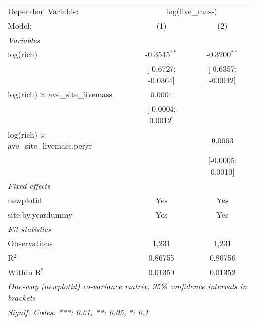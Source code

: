 \begin{tabular}{lcc}
\tabularnewline\midrule\midrule
Dependent Variable:&\multicolumn{2}{c}{log(live\_mass)}\\
Model:&(1) & (2)\\
\midrule \emph{Variables}&   &  \\
log(rich)&-0.3545$^{**}$ & -0.3200$^{**}$\\
  &[-0.6727; -0.0364] & [-0.6357; -0.0042]\\
log(rich) $\times $ ave\_site\_livemass&0.0004 &   \\
  &[-0.0004; 0.0012] &   \\
log(rich) $\times $ ave\_site\_livemass.peryr&   & 0.0003\\
  &   & [-0.0005; 0.0010]\\
\midrule \emph{Fixed-effects}&   &  \\
newplotid & Yes & Yes\\
site.by.yeardummy & Yes & Yes\\
\midrule \emph{Fit statistics}&  & \\
Observations & 1,231&1,231\\
R$^2$ & 0.86755&0.86756\\
Within R$^2$ & 0.01350&0.01352\\
\midrule\midrule\multicolumn{3}{l}{\emph{One-way (newplotid) co-variance matrix, 95\% confidence intervals in brackets}}\\
\multicolumn{3}{l}{\emph{Signif. Codes: ***: 0.01, **: 0.05, *: 0.1}}\\
\end{tabular}


